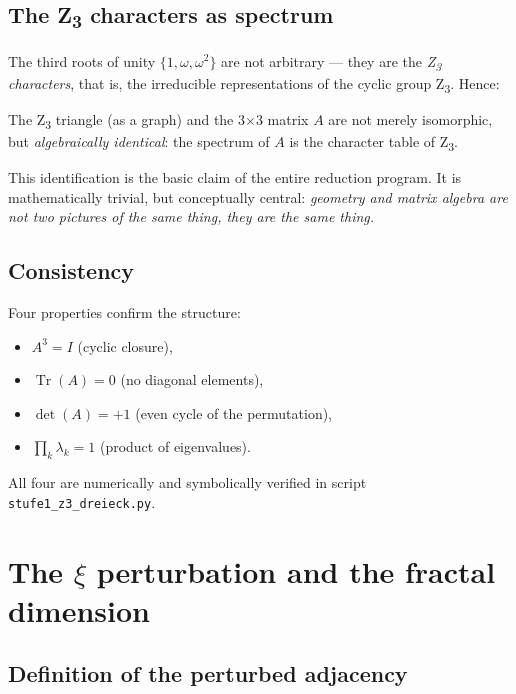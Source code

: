 \subsection[The Z3 characters as spectrum]{The Z\textsubscript{3} characters as spectrum}

The third roots of unity \(\{1, \omega, \omega^2\}\) are not arbitrary --- they are the \emph{Z\textsubscript{3} characters}, that is, the irreducible representations of the cyclic group Z\textsubscript{3}. Hence:

\begin{insightBox}
The Z\textsubscript{3} triangle (as a graph) and the 3$\times$3 matrix \(A\) are not merely isomorphic, but \emph{algebraically identical}: the spectrum of \(A\) is the character table of Z\textsubscript{3}.
\end{insightBox}

This identification is the basic claim of the entire reduction program. It is mathematically trivial, but conceptually central: \emph{geometry and matrix algebra are not two pictures of the same thing, they are the same thing.}

\subsection{Consistency}

Four properties confirm the structure:
\begin{itemize}
\item \(A^3 = I\) (cyclic closure),
\item \(\operatorname{Tr}(A) = 0\) (no diagonal elements),
\item \(\det(A) = +1\) (even cycle of the permutation),
\item \(\prod_k \lambda_k = 1\) (product of eigenvalues).
\end{itemize}

All four are numerically and symbolically verified in script \texttt{stufe1\_z3\_dreieck.py}.

\section[The xi perturbation and the fractal dimension]{The \texorpdfstring{\(\xi\)}{xi} perturbation and the fractal dimension}
\label{sec:kern2}

\subsection{Definition of the perturbed adjacency}

